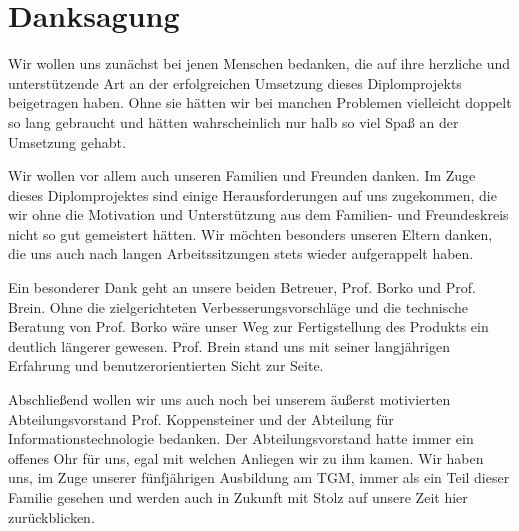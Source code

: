 \section*{Danksagung}
\cfoot{}
Wir wollen uns zunächst bei jenen Menschen bedanken, die auf ihre herzliche und unterstützende Art an der erfolgreichen Umsetzung dieses Diplomprojekts beigetragen haben. Ohne sie hätten wir bei manchen Problemen vielleicht doppelt so lang gebraucht und hätten wahrscheinlich nur halb so viel Spaß an der Umsetzung gehabt.

Wir wollen vor allem auch unseren Familien und Freunden danken. Im Zuge dieses Diplomprojektes sind einige Herausforderungen auf uns zugekommen, die wir ohne die Motivation und Unterstützung aus dem Familien- und Freundeskreis nicht so gut gemeistert hätten. Wir möchten besonders unseren Eltern danken, die uns auch nach langen Arbeitssitzungen stets wieder aufgerappelt haben.

Ein besonderer Dank geht an unsere beiden Betreuer, Prof. Borko und Prof. Brein. Ohne die zielgerichteten Verbesserungsvorschläge und die technische Beratung von Prof. Borko wäre unser Weg zur Fertigstellung des Produkts ein deutlich längerer gewesen. Prof. Brein stand uns mit seiner langjährigen Erfahrung und benutzerorientierten Sicht zur Seite.

Abschließend wollen wir uns auch noch bei unserem äußerst motivierten Abteilungsvorstand Prof. Koppensteiner und der Abteilung für Informationstechnologie bedanken. Der Abteilungsvorstand hatte immer ein offenes Ohr für uns, egal mit welchen Anliegen wir zu ihm kamen. Wir haben uns, im Zuge unserer fünfjährigen Ausbildung am TGM, immer als ein Teil dieser Familie gesehen und werden auch in Zukunft mit Stolz auf unsere Zeit hier zurückblicken.
